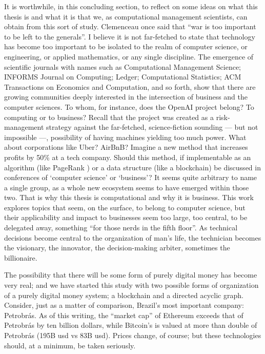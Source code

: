 It is worthwhile, in this concluding section, to reflect on some ideas on what this thesis is and what it is that we, as computational management scientists, can obtain from this sort of study.  Clemenceau once said that ``war is too important to be left to the generals''.  I believe it is not far-fetched to state that technology has become too important to be isolated to the realm of computer science, or engineering, or applied mathematics, or any single discipline.  The emergence of scientific journals with names such as Computational Management Science; INFORMS Journal on Computing; Ledger; Computational Statistics; ACM Transactions on Economics and Computation, and so forth, show that there are growing communities deeply interested in the intersection of business and the computer sciences.  To whom, for instance, does the OpenAI project belong?  To computing or to business?  Recall that the project was created as a risk-management strategy against the far-fetched, science-fiction sounding --- but not impossible ---, possibility of having machines yielding too much power.  What about corporations like Uber?  AirBnB?  Imagine a new method that increases profits by 50\% at a tech company.  Should this method, if implementable as an algorithm (like PageRank \citep{brin1998anatomy}) or a data structure (like a blockchain) be discussed in conferences of `computer science' or `business'? It seems quite arbitrary to name a single group, as a whole new ecosystem seems to have emerged within those two. That is why this thesis is computational and why it is business.  This work explores topics that seem, on the surface, to belong to computer science, but their applicability and impact to businesses seem too large, too central, to be delegated away, something ``for those nerds in the fifth floor''.  As technical decisions become central to the organization of man's life, the technician becomes the visionary, the innovator, the decision-making arbiter, sometimes the billionaire.

The possibility that there will be some form of purely digital money has become very real; and we have started this study with two possible forms of organization of a purely digital money system; a blockchain and a directed acyclic graph.  Consider, just as a matter of comparison, Brazil's most important company: Petrobrás.  As of this writing, the ``market cap'' of Ethereum exceeds that of Petrobrás by ten billion dollars, while Bitcoin's is valued at more than double of Petrobrás (195B usd vs 83B usd).  Prices change, of course; but these technologies should, at a minimum, be taken seriously.



